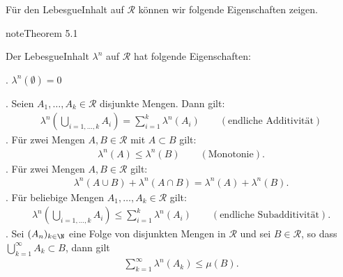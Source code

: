 \documentclass[letterpaper,10pt,english]{jupyterBook}
\begin{document}
\sphinxAtStartPar
Für den Lebesgue\sphinxhyphen{}Inhalt auf \(\mathcal{R}\) können wir folgende Eigenschaften zeigen.
\label{masstheorie/masstheorie:thm:lebesguevolume}
\begin{sphinxadmonition}{note}{Theorem 5.1}



\sphinxAtStartPar
Der Lebesgue\sphinxhyphen{}Inhalt \(\lambda^n\) auf \(\mathcal{R}\) hat folgende Eigenschaften:

. \(\lambda^n(\emptyset) = 0\)

. Seien \(A_1, \ldots, A_k \in \mathcal{R}\) disjunkte Mengen.
Dann gilt:
\begin{equation*}
\begin{split}\lambda^n \left( \bigcup_{i=1,\ldots,k} A_i \right) = \sum_{i=1}^k \lambda^n(A_i) \qquad (\text{endliche Additivität})\end{split}
\end{equation*}
. Für zwei Mengen \(A, B \in \mathcal{R}\) mit \(A \subset B\) gilt:
\begin{equation*}
\begin{split}\lambda^n(A) \leq \lambda^n(B) \qquad (\text{Monotonie}).\end{split}
\end{equation*}
. Für zwei Mengen \(A, B \in \mathcal{R}\) gilt:
\begin{equation*}
\begin{split}\lambda^n(A \cup B) + \lambda^n(A \cap B) = \lambda^n(A) + \lambda^n(B).\end{split}
\end{equation*}
. Für beliebige Mengen \(A_1, \ldots, A_k \in \mathcal{R}\) gilt:
\begin{equation*}
\begin{split}\lambda^n\left( \bigcup_{i=1,\ldots,k} A_i\right) \leq \sum_{i=1}^k \lambda^n(A_i) \qquad (\text{endliche Subadditivität}).\end{split}
\end{equation*}
. Sei \((A_n)_{k\in\N}\) eine Folge von disjunkten Mengen in \(\mathcal{R}\) und sei \(B \in \mathcal{R}\), so dass \(\bigcup_{k=1}^\infty A_k \subset B\), dann gilt
\begin{equation*}
\begin{split}\sum_{k=1}^\infty  \lambda^n(A_k) \leq \mu(B).\end{split}
\end{equation*}\end{sphinxadmonition}
\end{document}
